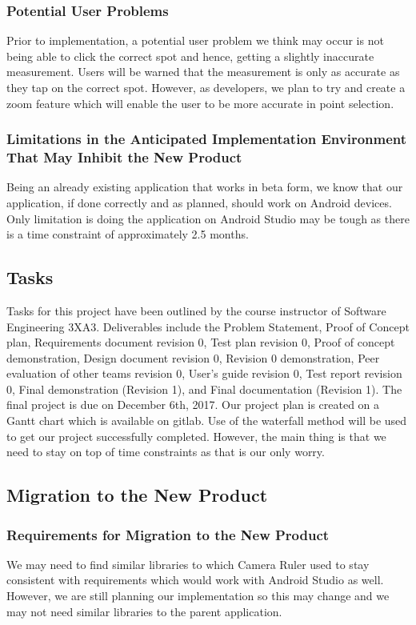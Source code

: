 \documentclass[12pt, titlepage]{article}
\begin{document}
\subsubsection{Potential User Problems}
Prior to implementation, a potential user problem we think may occur is not being able to click the correct spot and hence, getting a slightly inaccurate measurement. Users will be warned that the measurement is only as accurate as they tap on the correct spot. However, as developers, we plan to try and create a zoom feature which will enable the user to be more accurate in point selection. 

\subsubsection{Limitations in the Anticipated Implementation Environment That May Inhibit the New Product}
Being an already existing application that works in beta form, we know that our application, if done correctly and as planned, should work on Android devices. Only limitation is doing the application on Android Studio may be tough as there is a time constraint of approximately 2.5 months.
\subsection{Tasks}
Tasks for this project have been outlined by the course instructor of Software Engineering 3XA3. Deliverables include the Problem Statement, Proof of Concept plan, Requirements document revision 0, Test plan revision 0, Proof of concept demonstration, Design document revision 0, Revision 0 demonstration, Peer evaluation of other teams revision 0, User’s guide revision 0, Test report revision 0, Final demonstration (Revision 1), and Final documentation (Revision 1).  The final project is due on December 6th, 2017. Our project plan is created on a Gantt chart which is available on gitlab. Use of the waterfall method will be used to get our project successfully completed. However, the main thing is that we need to stay on top of time constraints as that is our only worry.
\subsection{Migration to the New Product}
\subsubsection{Requirements for Migration to the New Product}
We may need to find similar libraries to which Camera Ruler used to stay consistent with requirements which would work with Android Studio as well. However, we are still planning our implementation so this may change and we may not need similar libraries to the parent application.
\end{document}

